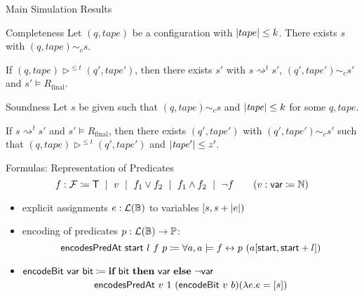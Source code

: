 \documentclass[11pt,usenames,dvipsnames,
hyperref={pdfencoding=auto,psdextra}]{beamer}
\newcommand{\bnfmid}{~\mid~}
\newcommand{\defeq}{\coloneqq}
\newcommand{\reprc}{\ensuremath{\sim_c}}
\newcommand{\Rfinal}{R_{\text{final}}}
\begin{document}
\begin{frame}{Main Simulation Results}
  \begin{block}{Completeness}
    Let $(q, \mathit{tape})$ be a configuration with $|tape| \le k$. There exists $s$ with $(q, \mathit{tape}) \reprc{} s$.

    If $(q, \mathit{tape}) \triangleright^{\le t} (q', \mathit{tape}')$, then there exists $s'$ with $s \rightsquigarrow^t s'$, $(q', \mathit{tape}') \reprc{} s'$ and $s' \models \Rfinal$. 
  \end{block}

  \begin{block}{Soundness}
    Let $s$ be given such that $(q, \mathit{tape}) \reprc{} s$ and $|\mathit{tape}| \le k$ for some $q, \mathit{tape}$. 

    If $s \rightsquigarrow^t s'$ and $s' \models \Rfinal$, then there exists $(q', \mathit{tape}')$ with $(q', \mathit{tape}') \reprc{} s'$ such that $(q, \mathit{tape}) \triangleright^{\le t} (q', \mathit{tape}')$ and $|\mathit{tape}'| \le z'$. 
  \end{block}
\end{frame}

\begin{frame}{Formulas: Representation of Predicates}
  \vspace{-3ex}
  \[f : \formula \defeq \btrue \bnfmid v \bnfmid f_1 \lor f_2 \bnfmid f_1 \land f_2 \bnfmid \lnot f \qquad (v : \bvar{} \defeq \nat) \]
  \vspace{3ex}

  \begin{itemize}
    \item explicit assignments $e : \mathcal{L} (\mathbb{B})$ to variables $[s, s + |e|)$
    \item encoding of predicates $p : \mathcal{L} (\mathbb{B}) \rightarrow \mathbb{P}$: \[\encodesPred~\textsf{start}~l~f~p \defeq \forall a, a \models f \leftrightarrow p~(a[\textsf{start}, \textsf{start} + l])\]
    \item $\textsf{encodeBit}~\textsf{var}~\textsf{bit} \defeq \ITE{\textsf{bit}}{\textsf{var}}{\lnot \textsf{var}}$
      \[\textsf{encodesPredAt}~v~1~(\textsf{encodeBit}~v~b) (\lambda e. e = [s]) \]
  \end{itemize} 
\end{frame}
\end{document}
